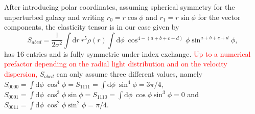 \documentclass[a4paper,fleqn,usenatbib]{mnras}
\newcommand\foca[1]{\textcolor{red}{#1}}
\newcommand{\dd}{\mathrm{d}}
\begin{document}
After introducing polar coordinates, assuming spherical symmetry for the unperturbed galaxy and writing $r_0=r\cos\phi$ and $r_1=r\sin\phi$ for the vector components, the elasticity tensor is in our case given by
\begin{equation}
S_{abcd} = 
\frac{1}{2\sigma^2}\int\dd r\:r^5\rho(r)\int\dd\phi\:\cos^{4-(a+b+c+d)}\phi\sin^{a+b+c+d}\phi,
\end{equation}
has 16 entries and is fully symmetric under index exchange. \foca{Up to a numerical prefactor depending on the radial light distribution and on the velocity dispersion,} $S_{abcd}$ can only assume three different values, namely $S_{0000} = \int\dd\phi\:\cos^4\phi = S_{1111} = \int\dd\phi\:\sin^4\phi = 3\pi/4$, $S_{0001} = \int\dd\phi\:\cos^3\phi\sin\phi = S_{1110} = \int\dd\phi\:\cos\phi\sin^3\phi = 0$ and $S_{0011} = \int\dd\phi\:\cos^2\phi\sin^2\phi = \pi/4$.
\end{document}
